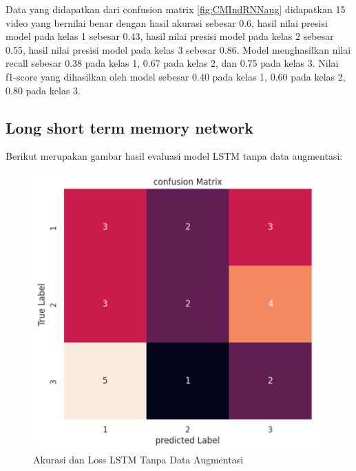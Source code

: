 Data yang didapatkan dari confusion matrix \ref{fig:CMIndRNNaug} didapatkan 15 video yang bernilai benar
dengan hasil akurasi sebesar 0.6, hasil nilai presisi model pada kelas 1 sebesar 0.43, hasil nilai
presisi model pada kelas 2 sebesar 0.55, hasil nilai presisi model pada kelas 3 sebesar 0.86. Model menghasilkan
nilai recall sebesar 0.38 pada kelas 1, 0.67 pada kelas 2, dan 0.75 pada kelas 3. Nilai f1-score yang dihasilkan
oleh model sebesar 0.40 pada kelas 1, 0.60 pada kelas 2, 0.80 pada kelas 3.

\subsection{Long short term memory network}

Berikut merupakan gambar hasil evaluasi model LSTM tanpa data augmentasi:
\newpage
\begin{figure} [ht] \centering
  \includegraphics[scale=0.7]{gambar/CMLSTMnoAug.png}
  \caption{Akurasi dan Loss LSTM Tanpa Data Augmentasi}
  \label{fig:CMLSTMnoaug}
\end{figure}

